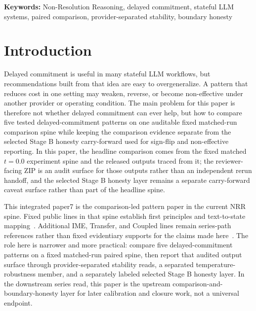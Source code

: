 \documentclass[11pt,a4paper]{article}
\begin{document}
\begin{abstract}
by explicit provider-separated stability, tail-risk disclosure, robustness, and separately labeled sign-flip and non-effective reporting rather than by a same-scale cross-family ranking or universal deployment rule.

\end{abstract}

\noindent\textbf{Keywords:} Non-Resolution Reasoning, delayed commitment, stateful LLM systems, paired comparison, provider-separated stability, boundary honesty

\section{Introduction}
\label{sec:intro}

Delayed commitment is useful in many stateful LLM workflows, but recommendations built from that idea are easy to overgeneralize. A pattern that reduces cost in one setting may weaken, reverse, or become non-effective under another provider or operating condition. The main problem for this paper is therefore not whether delayed commitment can ever help, but how to compare five tested delayed-commitment patterns on one auditable fixed matched-run comparison spine while keeping the comparison evidence separate from the selected Stage B honesty carry-forward used for sign-flip and non-effective reporting. In this paper, the headline comparison comes from the fixed matched \(t=0.0\) experiment spine and the released outputs traced from it; the reviewer-facing ZIP is an audit surface for those outputs rather than an independent rerun handoff, and the selected Stage B honesty layer remains a separate carry-forward caveat surface rather than part of the headline spine.

This integrated paper7 is the comparison-led pattern paper in the current NRR spine. Fixed public lines in that spine establish first principles and text-to-state mapping~\cite{saito2025nrr,saito2026phi}. Additional IME, Transfer, and Coupled lines remain series-path references rather than fixed evidentiary supports for the claims made here~\cite{saito2026ime,saito2026transfer,saito2026coupled}. The role here is narrower and more practical: compare five delayed-commitment patterns on a fixed matched-run paired spine, then report that audited output surface through provider-separated stability reads, a separated temperature-robustness member, and a separately labeled selected Stage B honesty layer. In the downstream series read, this paper is the upstream comparison-and-boundary-honesty layer for later calibration and closure work, not a universal endpoint.
\end{document}
